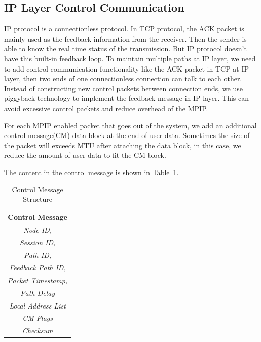\subsection{IP Layer Control Communication}
IP protocol is a connectionless protocol. In TCP protocol, the ACK packet is mainly used as the feedback information from the receiver. Then the sender is able to know the real time status of the transmission. But IP protocol doesn't have this built-in feedback loop. To maintain multiple paths at IP layer, we need to add control communication functionality like the ACK packet in TCP at IP layer, then two ends of one connectionless connection can talk to each other. 
Instead of constructing new control packets between connection ends, we use piggyback technology to implement the feedback message in IP layer. This can avoid excessive control packets and reduce overhead of the MPIP.

For each MPIP enabled packet that goes out of the system, we add an additional control message(CM) data block at the end of user data. 
Sometimes the size of the packet will exceeds MTU after attaching the data block, in this case, we reduce the amount of user data to fit the CM block. 



The content in the control message is shown in Table~\ref{tb.cm}.

\begin{table}
\caption{\label{tb.cm}Control Message Structure}
\centering
\begin{tabular}{|c|}
\hline
Control Message \\
\hline
\emph{Node ID,} \\
\emph{Session ID,} \\
\emph{Path ID,} \\
\emph{Feedback Path ID,} \\
\emph{Packet Timestamp,} \\
\emph{Path Delay}\\
\emph{Local Address List}\\
\emph{CM Flags}\\
\emph{Checksum}\\
\hline
\end{tabular}
\end{table}


